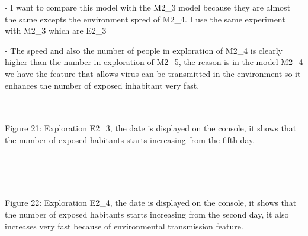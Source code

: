 \documentclass{article}
\begin{document}
\begin{pic15}
\begin{pic15}
\raggedright- I want to compare this model with the M2\_3 model because they are almost the same excepts the environment spred of M2\_4. I use the same experiment with M2\_3 which are E2\_3
\\
\raggedright- The speed and also the number of people in exploration of M2\_4 is clearly higher than the number in exploration of M2\_5, the reason is in the model M2\_4 we have the feature that allows virus can be transmitted in the environment so it enhances the number of exposed inhabitant very fast.
\\\\
\begin{pic21}
\\
\caption{Figure 21: Exploration E2\_3, the date is displayed on the console, it shows that the number of exposed habitants starts increasing from the fifth day.} 
\end{pic21}
\\\\
\begin{pic22}
\\
\caption{Figure 22: Exploration E2\_4, the date is displayed on the console, it shows that the number of exposed habitants starts increasing from the second day, it also increases very fast because of environmental transmission feature.} 
\end{pic22}
\newpage

\end{pic15}
\end{pic15}
\end{document}
